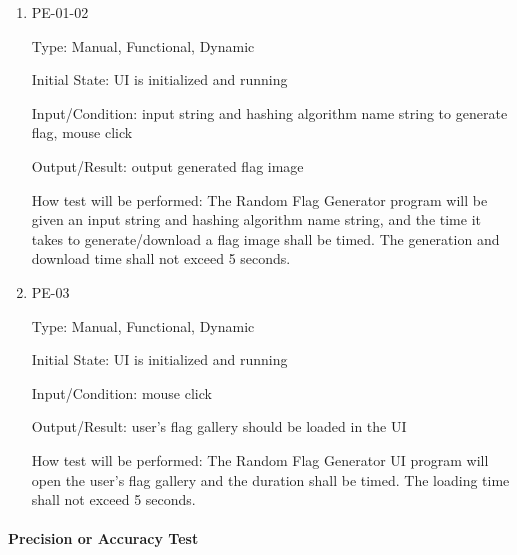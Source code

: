 \documentclass[12pt, titlepage]{article}
\begin{document}
\begin{enumerate}

\item{PE-01-02\\}

Type: Manual, Functional, Dynamic

Initial State: UI is initialized and running

Input/Condition: input string and hashing algorithm name string to generate
flag, mouse click

Output/Result: output generated flag image

How test will be performed: The Random Flag Generator program will be given an
input string and hashing algorithm name string, and the time it takes to
generate/download a flag image shall be timed. The generation and download
time shall not exceed 5 seconds.

\item{PE-03\\}

Type: Manual, Functional, Dynamic

Initial State: UI is initialized and running

Input/Condition: mouse click

Output/Result: user's flag gallery should be loaded in the UI

How test will be performed: The Random Flag Generator UI program will open the
user's flag gallery and the duration shall be timed. The loading time shall
not exceed 5 seconds.

\end{enumerate}

\paragraph{Precision or Accuracy Test}
\end{document}
